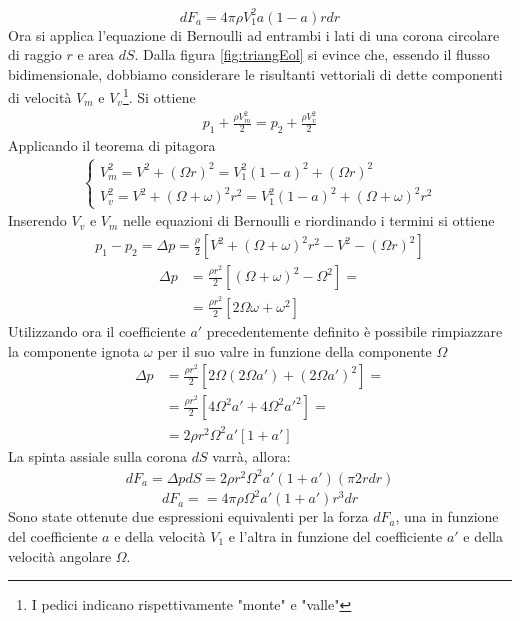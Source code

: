 \begin{equation}\label{eq:forza1}
dF_a = 4 \pi \rho	V_1^2 a \left( 1-a \right) r dr
\end{equation}
Ora si applica l'equazione di Bernoulli ad entrambi i lati di una corona circolare di raggio $r$ e area $dS$. Dalla figura \ref{fig:triangEol} si evince che, essendo il flusso bidimensionale, dobbiamo considerare le risultanti vettoriali di dette componenti di velocità $V_m$ e $V_v$\footnote{I pedici indicano rispettivamente "monte" e "valle"}. Si ottiene
\begin{align*}
p_1 + \frac{\rho V_m^2}{2} = p_2 + \frac{\rho V_v^2}{2}
\end{align*}
Applicando il teorema di pitagora
\begin{align*}
\begin{cases}
V_m^2 = V^2 + \left( \Omega r \right)^2 = V_1^2 \left(1-a \right)^2 + \left( \Omega r \right)^2\\
V_v^2 = V^2 + \left( \Omega + \omega \right)^2 r^2= V_1^2 \left(1-a \right)^2 + \left( \Omega + \omega \right)^2 r^2
\end{cases}
\end{align*}
Inserendo $V_v$ e $V_m$ nelle equazioni di Bernoulli e riordinando i termini si ottiene
\begin{align*}
p_1 - p_2 = \Delta p = \frac{\rho}{2} \left[ V^2 + \left( \Omega + \omega \right)^2 r^2 - V^2 - \left( \Omega r \right)^2 \right]
\end{align*}
\begin{align*}
\Delta p &= \frac{\rho r^2}{2} \left[ \left( \Omega + \omega \right)^2 - \Omega^2 \right]= \\
&= \frac{\rho r^2}{2} \left[ 2 \Omega \omega + \omega^2 \right]
\end{align*}
Utilizzando ora il coefficiente $a'$ precedentemente definito è possibile rimpiazzare la componente ignota $\omega$ per il suo valre in funzione della componente $\Omega$
\begin{align*}
\Delta p &= \frac{\rho r^2}{2} \left[ 2 \Omega \left( 2 \Omega a'\right) + \left( 2 \Omega a' \right)^2 \right]=\\
&= \frac{\rho r^2}{2} \left[ 4 \Omega^2 a' + 4 \Omega^2 a'^2 \right] = \\
&= 2 \rho r^2 \Omega^2 a' \left[ 1+a' \right]
\end{align*}
La spinta assiale sulla corona $dS$ varrà, allora:
\begin{align*}
dF_a = \Delta p dS = 2 \rho r^2 \Omega^2 a' \left(1 + a' \right) \left( \pi 2 r dr \right)
\end{align*}
\begin{equation}\label{eq:forza2}
dF_a = = 4 \pi \rho \Omega^2 a' \left( 1+ a' \right) r^3 dr
\end{equation}
Sono state ottenute due espressioni equivalenti per la forza $dF_a$, una in funzione del coefficiente $a$ e della velocità $V_1$ e l'altra in funzione del coefficiente $a'$ e della velocità angolare $\Omega$. 

